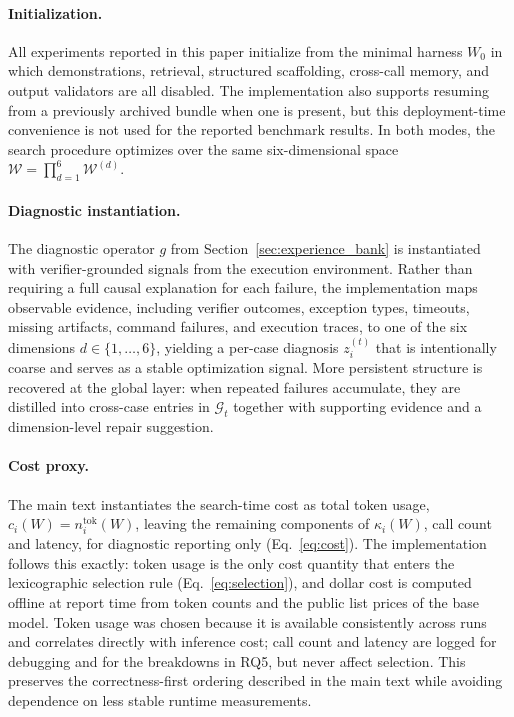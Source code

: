 \documentclass{article}
\begin{document}
\paragraph{Initialization.}
All experiments reported in this paper initialize from the minimal
harness $W_0$ in which demonstrations, retrieval, structured
scaffolding, cross-call memory, and output validators are all disabled.
The implementation also supports resuming from a previously archived
bundle when one is present, but this deployment-time convenience is not
used for the reported benchmark results. In both modes, the search
procedure optimizes over the same six-dimensional space
$\mathcal{W} = \prod_{d=1}^{6} \mathcal{W}^{(d)}$.

\paragraph{Diagnostic instantiation.}
The diagnostic operator $g$ from Section~\ref{sec:experience_bank} is
instantiated with verifier-grounded signals from the execution
environment. Rather than requiring a full causal explanation for each
failure, the implementation maps observable evidence, including verifier
outcomes, exception types, timeouts, missing artifacts, command
failures, and execution traces, to one of the six dimensions
$d \in \{1, \ldots, 6\}$, yielding a per-case diagnosis $z_i^{(t)}$
that is intentionally coarse and serves as a stable optimization
signal. More persistent structure is recovered at the global layer:
when repeated failures accumulate, they are distilled into cross-case
entries in $\mathcal{G}_t$ together with supporting evidence and a
dimension-level repair suggestion.

\paragraph{Cost proxy.}
The main text instantiates the search-time cost as total token usage,
$c_i(W) = n_i^{\mathrm{tok}}(W)$, leaving the remaining components of
$\kappa_i(W)$, call count and latency, for diagnostic reporting
only (Eq.~\ref{eq:cost}). The implementation follows this exactly:
token usage is the only cost quantity that enters the lexicographic
selection rule (Eq.~\ref{eq:selection}), and dollar cost is computed
offline at report time from token counts and the public list prices
of the base model. Token usage was chosen because it is available
consistently across runs and correlates directly with inference cost;
call count and latency are logged for debugging and for the
breakdowns in RQ5, but never affect
selection. This preserves the correctness-first ordering described in
the main text while avoiding dependence on less stable runtime
measurements.
\end{document}
